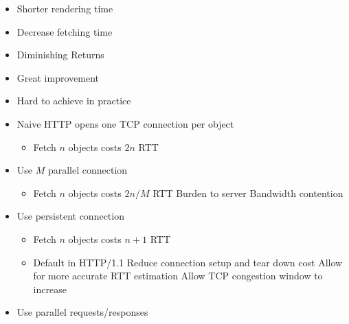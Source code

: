 \begin{itemize}
\begin{itemize}
\begin{itemize}
                    \item Shorter rendering time
                \end{itemize}
                \begin{itemize}
                    \item Decrease fetching time
                    \item Diminishing Returns
                \end{itemize}
                \begin{itemize}
                    \item Great improvement
                    \item Hard to achieve in practice
                \end{itemize}
                \begin{itemize}
                    \item Naive HTTP opens one TCP connection per object
                        \begin{itemize}
                            \item Fetch $n$ objects costs $2n$ RTT
                        \end{itemize}
                    \item Use $M$ parallel connection
                        \begin{itemize}
                            \item Fetch $n$ objects costs $2n / M$ RTT
                            \icon Burden to server
                            \icon Bandwidth contention
                        \end{itemize}
                    \item Use persistent connection
                        \begin{itemize}
                            \item Fetch $n$ objects costs $n + 1$ RTT
                            \item Default in HTTP/1.1
                            \ipro Reduce connection setup and tear down cost
                            \ipro Allow for more accurate RTT estimation
                            \ipro Allow TCP congestion window to increase
                        \end{itemize}
                    \item Use parallel requests/responses

\end{itemize}
\end{itemize}
\end{itemize}
